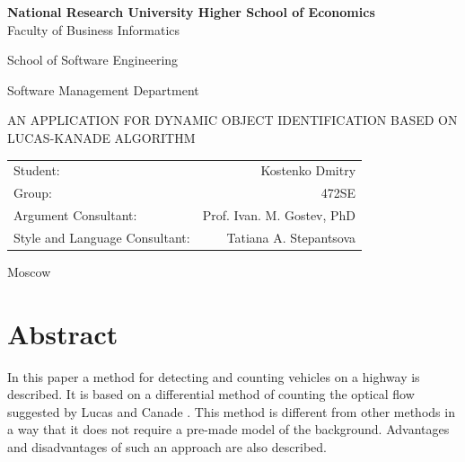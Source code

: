 \documentclass[12pt,a4paper,oneside,titlepage]{article}
\author{Kostenko}
\begin{document}
{
\thispagestyle{empty}
\newpage
\centering

\textbf{
National Research University Higher School of Economics\\
}
Faculty of Business Informatics

School of Software Engineering

Software Management Department

\vfill


\begin{large}
\MakeTextUppercase{
An Application for Dynamic Object Identification Based on Lucas-Kanade Algorithm
}
\end{large}


\vfill

\begin{tabular}{lr}
Student: & Kostenko Dmitry \\
Group: & 472SE \\
Argument Consultant: & Prof. Ivan. M. Gostev, PhD \\
Style and Language Consultant: & Tatiana A. Stepantsova
\end{tabular}

\vspace{\fill}

Moscow\\ \number\year
\clearpage
}

\section*{Abstract}
{

In this paper a method for detecting and counting vehicles on a highway is described. 
It is based on a differential method of counting the optical flow suggested by Lucas and Canade \cite{lucaskanade}. 
This method is different from other methods in a way that it does not require a pre-made model of the background. 
Advantages and disadvantages of such an approach are also described.


}





{
\newpage
\centering
\tableofcontents
}
\end{document}
